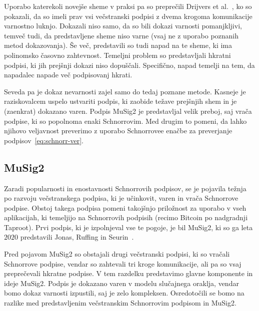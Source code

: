 Uporabo katerekoli novejše sheme v praksi pa so preprečili Drijvers et al.~\cite{drijvers2019security},
ko so pokazali, da so imeli prav vsi večstranski podpisi z dvema krogoma komunikacije varnostno
luknjo. Dokazali niso samo, da so bili dokazi varnosti pomanjkljivi, temveč tudi, da predstavljene
sheme niso varne (vsaj ne z uporabo poznanih metod dokazovanja). Še več, predstavili so tudi napad
na te sheme, ki ima polinomsko časovno zahtevnost. Temeljni problem so predstavljali hkratni podpisi,
ki jih prejšnji dokazi niso dopuščali. Specifično, napad temelji na tem, da napadalec napade več
podpisovanj hkrati.

Seveda pa je dokaz nevarnosti zajel samo do tedaj poznane metode. Kasneje je raziskovalcem uspelo
ustvariti podpis, ki zaobide težave prejšnjih shem in je (zaenkrat) dokazano varen. Podpis MuSig2
je predstavljal velik preboj, saj vrača podpise, ki so popolnoma enaki Schnorrovim. Med drugim to
pomeni, da lahko njihovo veljavnost preverimo z uporabo Schnorrovee enačbe za preverjanje
podpisov~\eqref{eq:schnorr-ver}.

\subsection{MuSig2}
\label{sec:musig2}
Zaradi popularnosti in enostavnosti Schnorrovih podpisov, se je pojavila težnja po razvoju večstranskega
podpisa, ki je učinkovit, varen in vrača Schnorrove podpise. Obstoj takega podpisa pomeni takojšnjo
priložnost za uporabo v vseh aplikacijah, ki temeljijo na Schnorrovih podpisih (recimo Bitcoin po
nadgradnji Taproot). Prvi podpis, ki je izpolnjeval vse te pogoje, je bil MuSig2, ki so ga leta $2020$
predstavili Jonas, Ruffing in Seurin~\cite{jonas2020musig2}.

Pred pojavom MuSig2 so obstajali drugi večstranski podpisi, ki so vračali Schnorrove podpise, vendar
so zahtevali tri kroge komunikacije, ali pa so vsaj preprečevali hkratne podpise. V tem razdelku
predstavimo glavne komponente in ideje MuSig2. Podpis je dokazano varen v modelu slučajnega oraklja,
vendar bomo dokaz varnosti izpustili, saj je zelo kompleksen. Osredotočili se bomo na razlike med
predstavljenim večstranskim Schnorrovim podpisom in MuSig2.

